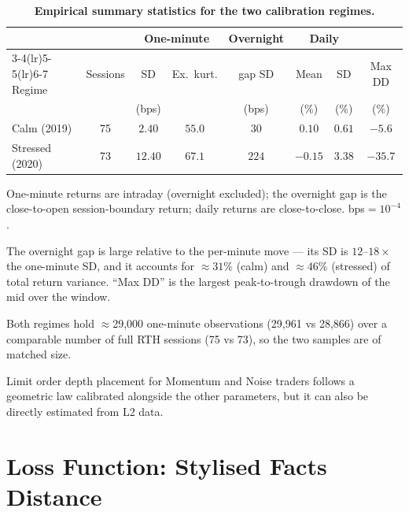 \begin{table}[h]
\centering
\small
\setlength{\tabcolsep}{6pt}
\caption{\textbf{Empirical summary statistics for the two calibration regimes.}}
\label{tab:cal-data}
\begin{threeparttable}
\begin{tabular}{l c cc c cc c}
\toprule
 & & \multicolumn{2}{c}{One-minute} & Overnight & \multicolumn{2}{c}{Daily} & \\
\cmidrule(lr){3-4}\cmidrule(lr){5-5}\cmidrule(lr){6-7}
Regime & Sessions & SD & Ex.\ kurt. & gap SD & Mean & SD & Max DD\\
 & & (bps) & & (bps) & (\%) & (\%) & (\%)\\
\midrule
Calm (2019)     & 75 & $2.40$  & $55.0$ & $30$  & $0.10$  & $0.61$ & $-5.6$ \\
Stressed (2020) & 73 & $12.40$ & $67.1$ & $224$ & $-0.15$ & $3.38$ & $-35.7$ \\
\bottomrule
\end{tabular}
\begin{tablenotes}[flushleft]\footnotesize
\item One-minute returns are intraday (overnight excluded); the overnight gap is the
close-to-open session-boundary return; daily returns are close-to-close. bps${}=10^{-4}$.
\item The overnight gap is large relative to the per-minute move --- its SD is $12$--$18\times$ the
one-minute SD, and it accounts for $\approx 31\%$ (calm) and $\approx 46\%$ (stressed) of total return
variance. ``Max DD'' is the largest peak-to-trough drawdown of the mid over
the window.
\item Both regimes hold $\approx$29{,}000 one-minute observations (29{,}961 vs 28{,}866) over a
comparable number of full RTH sessions (75 vs 73), so the two samples are of matched size.
\end{tablenotes}
\end{threeparttable}
\end{table}


\noindent Limit order depth placement for Momentum and Noise traders follows a geometric law calibrated alongside the other parameters, but it can also be directly estimated from L2 data. 

\section{Loss Function: Stylised Facts Distance}
\label{sec:cal-loss}

